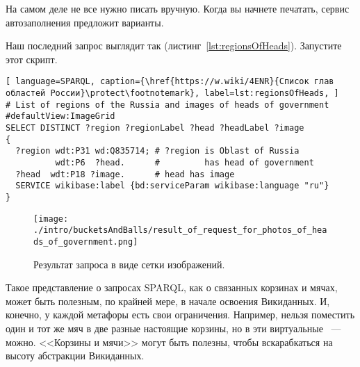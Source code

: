 На самом деле не все нужно писать вручную. Когда вы начнете печатать, сервис автозаполнения предложит варианты.

Наш последний запрос выглядит так (листинг~\ref{lst:regionsOfHeads}). Запустите этот скрипт.

\begin{lstlisting}[ language=SPARQL, caption={\href{https://w.wiki/4ENR}{Список глав областей России}\protect\footnotemark}, label=lst:regionsOfHeads, ]
# List of regions of the Russia and images of heads of government
#defaultView:ImageGrid
SELECT DISTINCT ?region ?regionLabel ?head ?headLabel ?image
{
  ?region wdt:P31 wd:Q835714; # ?region is Oblast of Russia
          wdt:P6  ?head.      #         has head of government
  ?head  wdt:P18 ?image.      # head has image
  SERVICE wikibase:label {bd:serviceParam wikibase:language "ru"} 
}
\end{lstlisting}


\begin{figure*}[h!]
\texttt{[image: ./intro/bucketsAndBalls/result\_of\_request\_for\_photos\_of\_heads\_of\_government.png]}
\caption{Результат запроса в виде сетки изображений.}
\end{figure*}


Такое представление о запросах SPARQL, как о связанных корзинах и мячах, может быть полезным, по крайней мере, в начале освоения Викиданных. И, конечно, у каждой метафоры есть свои ограничения. Например, нельзя поместить один и тот же мяч в две разные настоящие корзины, но в эти виртуальные ~--- можно. <<Корзины и мячи>> могут быть полезны, чтобы вскарабкаться на высоту абстракции Викиданных.
